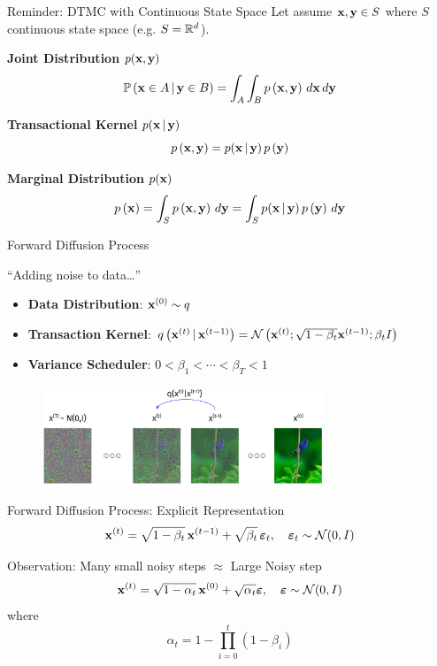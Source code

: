 \documentclass[aspectratio=169, 9pt]{beamer}
\theoremstyle{definition}
\begin{document}
\begin{frame}{Reminder: DTMC with Continuous State Space}
  Let assume $\mathbf{x},{\mathbf{y}}\in S$ where $S$ continuous state space (e.g.
  $S=\mathbb{R}^d$).\\
  \vfill
  \begin{block}{\textbf{Joint Distribution} $p(\mathbf{x},{\mathbf{y}})$}
  \[
    \mathbb{P}\left( \mathbf{x}\in A\,\vert\,{\mathbf{y}}\in B \right)=
    \int_A\int_B p\left( \mathbf{x},{\mathbf{y}} \right)\,d\mathbf{x}\,d{\mathbf{y}}
  \]
\end{block}
\begin{block}{\textbf{Transactional Kernel} $p(\mathbf{x}\,\vert\,{\mathbf{y}})$}
    \[
      p\left( \mathbf{x},{\mathbf{y}} \right) = p(\mathbf{x}\,\vert\,{\mathbf{y}})\,p\left( {\mathbf{y}} \right)
    \]
  \end{block}
  \begin{block}{\textbf{Marginal Distribution} $p(\mathbf{x})$}
    \[
      p\left( \mathbf{x} \right)=\int_S p\left( \mathbf{x},{\mathbf{y}} \right)\,d{\mathbf{y}} = \int_S
      p(\mathbf{x}\,\vert\,{\mathbf{y}})\,p\left( {\mathbf{y}}\right)\,d{\mathbf{y}} 
    \]
  \end{block}
\end{frame}
\begin{frame}{Forward Diffusion Process}
  \begin{center}
    ``Adding noise to data\ldots''
  \end{center}
  \begin{itemize}
    \item \textbf{Data Distribution}: $\mathbf{x}^{(0)}\sim q$
      \hfill{}
    \item \textbf{Transaction Kernel}: $q\left( \mathbf{x}^{(t)}\,\vert\,\mathbf{x}^{(t-1)}
      \right)=\mathcal{N}\left( \mathbf{x}^{(t)};\sqrt{1-\beta_t}\mathbf{x}^{(t-1)}; \beta_t I \right)$
    \item \textbf{Variance Scheduler}: $0<\beta_1<\cdots<\beta_T< 1$ 
  \end{itemize}
  \begin{figure}[h!]
    \centering
    \includegraphics[width=0.75\textwidth]{./pic/forward-diffusion.png}
  \end{figure}
\end{frame}
\begin{frame}{Forward Diffusion Process: Explicit Representation}
  \[
    \mathbf{x}^{(t)}=\sqrt{1-\beta_t}\,\mathbf{x}^{(t-1)} +
    \sqrt{\beta_t}\,{\boldsymbol{\varepsilon}}_t,\quad
    {\boldsymbol{\varepsilon}}_t\sim\mathcal{N}(0,I)
  \]
  \begin{block}{Observation: Many small noisy steps $\approx$ Large Noisy
    step}
    \[
      \mathbf{x}^{(t)} = \sqrt{1-\alpha_t}\, \mathbf{x}^{(0)} + \sqrt{\alpha_t}
      {\boldsymbol{\varepsilon}},\quad {\boldsymbol{\varepsilon}}\sim\mathcal{N}(0,I)
    \]
    where
    \[
      \alpha_t = 1-\prod_{i=0}^t(1-\beta_i)
    \]
  \end{block}
\end{frame}
\end{document}

